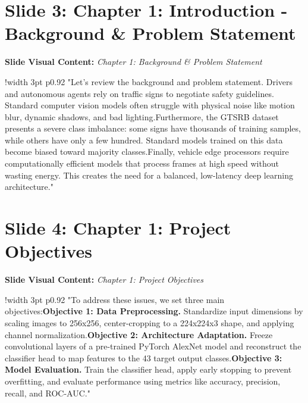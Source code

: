 \documentclass[11pt]{article}
\begin{document}
\section{Slide 3: Chapter 1: Introduction - Background \& Problem Statement}
\textbf{Slide Visual Content:} \textit{Chapter 1: Background \& Problem Statement}\\ [8pt]
\noindent
\begin{tabular}{!{\color{primary}\vrule width 3pt} p{0.92\textwidth}}
  \small\color{black!80} "Let's review the background and problem statement. Drivers and autonomous agents rely on traffic signs to negotiate safety guidelines. Standard computer vision models often struggle with physical noise like motion blur, dynamic shadows, and bad lighting.\newline\newline Furthermore, the GTSRB dataset presents a severe class imbalance: some signs have thousands of training samples, while others have only a few hundred. Standard models trained on this data become biased toward majority classes.\newline\newline Finally, vehicle edge processors require computationally efficient models that process frames at high speed without wasting energy. This creates the need for a balanced, low-latency deep learning architecture."
\end{tabular}
\vspace{15pt}

\section{Slide 4: Chapter 1: Project Objectives}
\textbf{Slide Visual Content:} \textit{Chapter 1: Project Objectives}\\ [8pt]
\noindent
\begin{tabular}{!{\color{primary}\vrule width 3pt} p{0.92\textwidth}}
  \small\color{black!80} "To address these issues, we set three main objectives:\newline\newline *   \textbf{Objective 1: Data Preprocessing.} Standardize input dimensions by scaling images to 256x256, center-cropping to a 224x224x3 shape, and applying channel normalization.\newline\newline *   \textbf{Objective 2: Architecture Adaptation.} Freeze convolutional layers of a pre-trained PyTorch AlexNet model and reconstruct the classifier head to map features to the 43 target output classes.\newline\newline *   \textbf{Objective 3: Model Evaluation.} Train the classifier head, apply early stopping to prevent overfitting, and evaluate performance using metrics like accuracy, precision, recall, and ROC-AUC."
\end{tabular}
\vspace{15pt}
\end{document}
